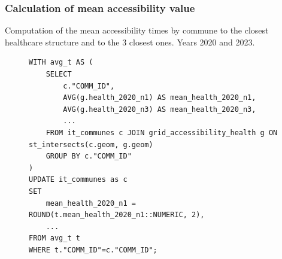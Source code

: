 \begin{frame}[containsverbatim]
	\frametitle{Calculation of mean accessibility value}
	
	Computation of the mean accessibility times by commune to the closest healthcare structure and to the 3 closest ones.
	Years 2020 and 2023.
	\begin{figure}[h]
	\begin{verbatim}
WITH avg_t AS (
	SELECT
		c."COMM_ID",
		AVG(g.health_2020_n1) AS mean_health_2020_n1,
		AVG(g.health_2020_n3) AS mean_health_2020_n3,
		...
	FROM it_communes c JOIN grid_accessibility_health g ON st_intersects(c.geom, g.geom)
	GROUP BY c."COMM_ID"
)
UPDATE it_communes as c
SET
	mean_health_2020_n1 = ROUND(t.mean_health_2020_n1::NUMERIC, 2),
	...
FROM avg_t t
WHERE t."COMM_ID"=c."COMM_ID";
	\end{verbatim}
	\end{figure}
	
\end{frame}







